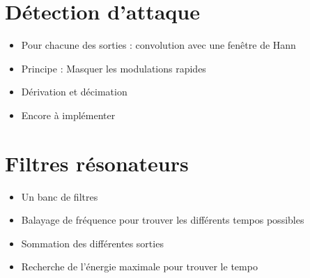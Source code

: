 \documentclass{beamer}
\begin{document}
 \section{Détection d'attaque}
   \begin{frame}
       \tableofcontents[currentsection]
\end{frame}

 \begin{frame}
  \begin{itemize}
   \item Pour chacune des sorties : convolution avec une fenêtre de Hann
  \end{itemize}
  \begin{itemize}
  \item<3-> Principe : Masquer les modulations rapides
  \end{itemize}
 \end{frame}

 \begin{frame}
  \begin{itemize}
   \item Dérivation et décimation
   \item<2-> Encore à implémenter
  \end{itemize}

 \end{frame}

 \section{Filtres résonateurs}
   \begin{frame}
       \tableofcontents[currentsection]
\end{frame}

\begin{frame}
\begin{itemize}
 \item Un banc de filtres
 \item<2-> Balayage de fréquence pour trouver les différents tempos possibles
 \item<3-> Sommation des différentes sorties
 \item<4-> Recherche de l'énergie maximale pour trouver le tempo
\end{itemize}

 
\end{frame}
\end{document}
